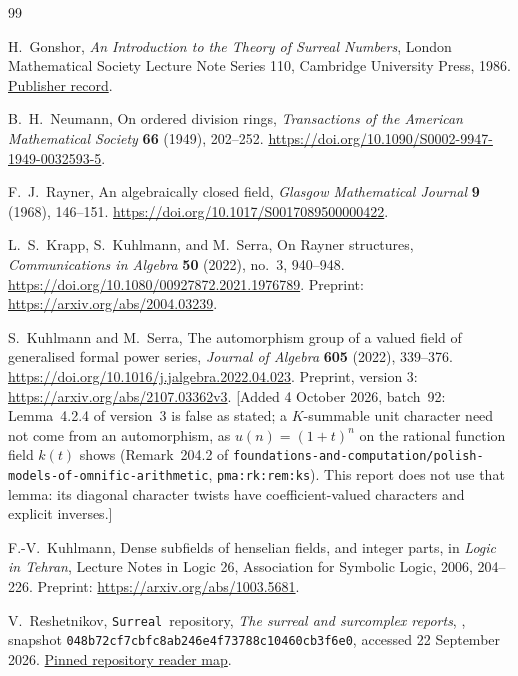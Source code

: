 \documentclass[11pt,oneside]{article}
\theoremstyle{definition}
\theoremstyle{remark}
\newcommand{\repoName}{\texttt{Surreal}}
\newcommand{\repo}[1]{\nolinkurl{#1}}%
\newcommand{\lbl}[1]{\nolinkurl{#1}}%
\newcommand{\pin}{\texttt{048b72cf7cbfc8ab246e4f73788c10460cb3f6e0}}
\begin{document}
\begin{thebibliography}{99}
\small\raggedright

H.~Gonshor,
\emph{An Introduction to the Theory of Surreal Numbers},
London Mathematical Society Lecture Note Series 110,
Cambridge University Press, 1986.
\href{https://www.cambridge.org/core/books/an-introduction-to-the-theory-of-surreal-numbers/312AE504A3E88E804054BFB390446374}{Publisher record}.

B.~H.~Neumann,
On ordered division rings,
\emph{Transactions of the American Mathematical Society}
\textbf{66} (1949), 202--252.
\url{https://doi.org/10.1090/S0002-9947-1949-0032593-5}.

F.~J.~Rayner,
An algebraically closed field,
\emph{Glasgow Mathematical Journal} \textbf{9} (1968), 146--151.
\url{https://doi.org/10.1017/S0017089500000422}.

L.~S.~Krapp, S.~Kuhlmann, and M.~Serra,
On Rayner structures,
\emph{Communications in Algebra} \textbf{50} (2022), no.~3, 940--948.
\url{https://doi.org/10.1080/00927872.2021.1976789}.
Preprint: \url{https://arxiv.org/abs/2004.03239}.

S.~Kuhlmann and M.~Serra,
The automorphism group of a valued field of generalised formal power
series,
\emph{Journal of Algebra} \textbf{605} (2022), 339--376.
\url{https://doi.org/10.1016/j.jalgebra.2022.04.023}.
Preprint, version 3: \url{https://arxiv.org/abs/2107.03362v3}.
[Added 4 October 2026, batch~92: Lemma~4.2.4 of version~3 is false as
stated; a $K$-summable unit character need not come from an automorphism, as
$u(n)=(1+t)^n$ on the rational function field $k(t)$ shows (Remark~204.2 of
\repo{foundations-and-computation/polish-models-of-omnific-arithmetic},
\lbl{pma:rk:rem:ks}). This report does not use that lemma: its diagonal
character twists have coefficient-valued characters and explicit inverses.]

F.-V.~Kuhlmann,
Dense subfields of henselian fields, and integer parts,
in \emph{Logic in Tehran}, Lecture Notes in Logic 26,
Association for Symbolic Logic, 2006, 204--226.
Preprint: \url{https://arxiv.org/abs/1003.5681}.

V.~Reshetnikov, \repoName\ repository,
\emph{The surreal and surcomplex reports},
, snapshot \pin,
accessed 22 September 2026.
\href{https://github.com/VladimirReshetnikov/Surreal/blob/048b72cf7cbfc8ab246e4f73788c10460cb3f6e0/docs/README.md}{Pinned repository reader map}.


\end{thebibliography}
\end{document}
